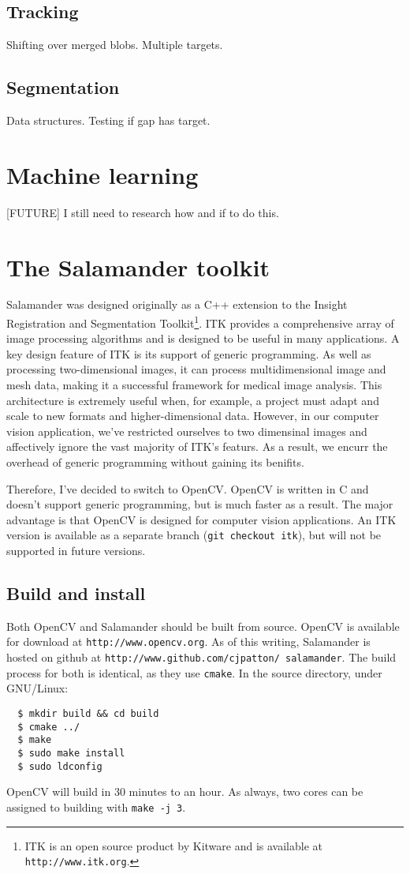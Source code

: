 \documentclass[letter]{article}
\newcounter{foot}
\begin{document}
\subsection{Tracking}

Shifting over merged blobs. 
Multiple targets. 

\subsection{Segmentation}
Data structures. 
Testing if gap has target. 

\section{Machine learning}
[FUTURE] I still need to research how and if to do this. 

 
\section{The Salamander toolkit}
Salamander was designed originally as a C++ extension to the Insight Registration and 
Segmentation Toolkit\footnote
{ITK is an open source product by Kitware and is available at \texttt{http://www.itk.org}.}.
ITK provides a comprehensive array of image processing algorithms and is designed to 
be useful in many applications. A key design feature of ITK is its support of generic programming. 
As well as processing two-dimensional images, it can process multidimensional image and 
mesh data, making it a successful framework for medical image analysis. This architecture 
is extremely useful when, for example, a project must adapt and scale to new formats and 
higher-dimensional data. However, in our computer vision application, we've restricted 
ourselves to two dimensinal images and affectively ignore the vast majority of ITK's featurs. 
As a result, we encurr the overhead of generic programming without gaining its benifits. 

Therefore, I've decided to switch to OpenCV. OpenCV is written in C and doesn't support 
generic programming, but is much faster as a result. The major advantage is that OpenCV
is designed for computer vision applications. An ITK version is available as a separate 
branch (\texttt{git checkout itk}), but will not be supported in future versions. 

\subsection{Build and install}
Both OpenCV and Salamander should be built from source. OpenCV is available for download at 
\texttt{http://www.opencv.org}. As of this writing, Salamander 
is hosted on github at \texttt{http://www.github.com/cjpatton/ salamander}. The build 
process for both is identical, as they use \texttt{cmake}. In the source directory, 
under GNU/Linux: 
\begin{verbatim}
  $ mkdir build && cd build
  $ cmake ../ 
  $ make
  $ sudo make install 
  $ sudo ldconfig
\end{verbatim}
OpenCV will build in 30 minutes to an hour. As always, 
two cores can be assigned to building with \texttt{make -j 3}. 
\end{document}
